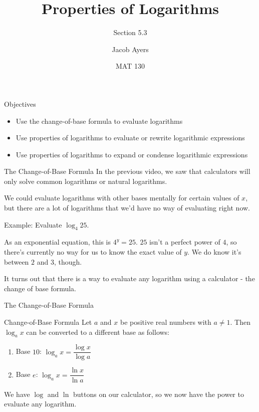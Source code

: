 \documentclass[t, aspectratio=169]{beamer}
\title[5.3]{Properties of Logarithms}
\subtitle{Section 5.3}
\author{Jacob Ayers}
\institute{Lesson \#19}
\date{MAT 130}
\begin{document}
	
	\begin{frame}
		\titlepage
	\end{frame}
	
	\begin{frame}{Objectives}
		\begin{itemize}
			\item Use the change-of-base formula to evaluate logarithms
			\item Use properties of logarithms to evaluate or rewrite logarithmic expressions
			\item Use properties of logarithms to expand or condense logarithmic expressions
		\end{itemize}
	\end{frame}

	\begin{frame}{The Change-of-Base Formula}
		In the previous video, we saw that calculators will only solve common logarithms or natural logarithms. 
		
		We could evaluate logarithms with other bases mentally for certain values of $x$, but there are a lot of logarithms that we'd have no way of evaluating right now. \pause
		
		Example: Evaluate $\log_4 25$. \pause
		
		As an exponential equation, this is $4^y = 25$. $25$ isn't a perfect power of $4$, so there's currently no way for us to know the exact value of $y$. We do know it's between $2$ and $3$, though. \pause
		
		It turns out that there is a way to evaluate any logarithm using a calculator - the change of base formula.	
	\end{frame}

	\begin{frame}{The Change-of-Base Formula}
		\begin{block}{Change-of-Base Formula}
			Let $a$ and $x$ be positive real numbers with $a \neq 1$. Then $\log_a x$ can be converted to a different base as follows: \begin{enumerate}[1)]
				\item Base $10$: $\log_a x = \dfrac{\log x}{\log a}$
				\item Base $e$: $\log_a x = \dfrac{\ln x}{\ln a}$
			\end{enumerate}
		\end{block} \pause
	
		We have $\log$ and $\ln$ buttons on our calculator, so we now have the power to evaluate any logarithm.
	\end{frame}
\end{document}
